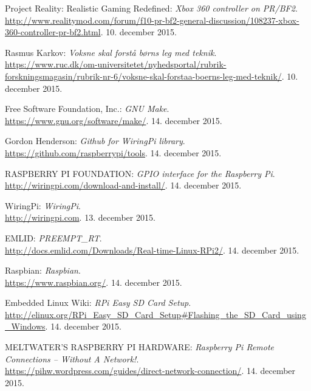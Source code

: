 \begin{thebibliography}{2}
 Project Reality: Realistic Gaming Redefined: \textit{Xbox 360 controller on PR/BF2}. \\
\url{http://www.realitymod.com/forum/f10-pr-bf2-general-discussion/108237-xbox-360-controller-pr-bf2.html}. 10. december 2015.

 Rasmus Karkov: \textit{Voksne skal forstå børns leg med teknik}. \\
\url{https://www.ruc.dk/om-universitetet/nyhedsportal/rubrik-forskningsmagasin/rubrik-nr-6/voksne-skal-forstaa-boerns-leg-med-teknik/}. 10. december 2015.

 Free Software Foundation, Inc.: \textit{GNU Make}. \\
\url{https://www.gnu.org/software/make/}. 14. december 2015.

 Gordon Henderson: \textit{Github for WiringPi library}. \\
\url{https://github.com/raspberrypi/tools}. 14. december 2015.

 RASPBERRY PI FOUNDATION: \textit{GPIO interface for the Raspberry Pi}. \\
\url{http://wiringpi.com/download-and-install/}. 14. december 2015.

 WiringPi: \textit{WiringPi}. \\
\url{http://wiringpi.com}. 13. december 2015.

 EMLID: \textit{PREEMPT\_RT}. \\
\url{http://docs.emlid.com/Downloads/Real-time-Linux-RPi2/}. 14. december 2015.

 Raspbian: \textit{Raspbian}. \\
\url{https://www.raspbian.org/}. 14. december 2015.

 Embedded Linux Wiki: \textit{RPi Easy SD Card Setup}. \\
\url{http://elinux.org/RPi_Easy_SD_Card_Setup#Flashing_the_SD_Card_using_Windows}. 14. december 2015.

 MELTWATER'S RASPBERRY PI HARDWARE: \textit{Raspberry Pi Remote Connections – Without A Network!}. \\
\url{https://pihw.wordpress.com/guides/direct-network-connection/}. 14. december 2015.

\end{thebibliography}
